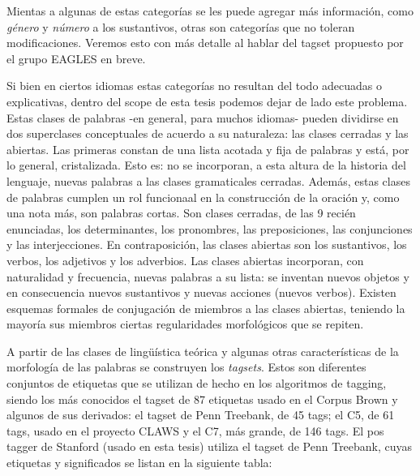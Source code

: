 Mientas a algunas de estas categorías se les puede agregar más información, como \textit{género} y \textit{número} a los sustantivos, otras son categorías que no toleran modificaciones. Veremos esto con más detalle al hablar del tagset propuesto por el grupo EAGLES en breve.

Si bien en ciertos idiomas estas categorías no resultan del todo adecuadas o explicativas, dentro del scope de esta tesis podemos dejar de lado este problema.
Estas clases de palabras -en general, para muchos idiomas- pueden dividirse en dos superclases conceptuales de acuerdo a su naturaleza: las clases cerradas y las abiertas. Las primeras constan de una lista acotada y fija de palabras y está, por lo general, cristalizada. Esto es: no se incorporan, a esta altura de la historia del lenguaje, nuevas palabras a las clases gramaticales cerradas. Además, estas clases de palabras cumplen un rol funcionaal en la construcción de la oración y, como una nota más, son palabras cortas. Son clases cerradas, de las 9 recién enunciadas, los determinantes, los pronombres, las preposiciones, las conjunciones y las interjecciones. En contraposición, las clases abiertas son los sustantivos, los verbos, los adjetivos y los adverbios. Las clases abiertas incorporan, con naturalidad y frecuencia, nuevas palabras a su lista: se inventan nuevos objetos y en consecuencia nuevos sustantivos y nuevas acciones (nuevos verbos). Existen esquemas formales de conjugación de miembros a las clases abiertas, teniendo la mayoría sus miembros ciertas regularidades morfológicos que se repiten. 

A partir de las clases de lingüística teórica y algunas otras características de la morfología de las palabras se construyen los \textit{tagsets}. Estos son diferentes conjuntos de etiquetas que se utilizan de hecho en los algoritmos de tagging, siendo los más conocidos el tagset de 87 etiquetas usado en el Corpus Brown y algunos de sus derivados: el tagset de Penn Treebank, de 45 tags; el C5, de 61 tags, usado en el proyecto CLAWS y el C7, más grande, de 146 tags. 
El pos tagger de Stanford\cite{POS2} (usado en esta tesis) utiliza el tagset de Penn Treebank, cuyas etiquetas y significados se listan en la siguiente tabla:

